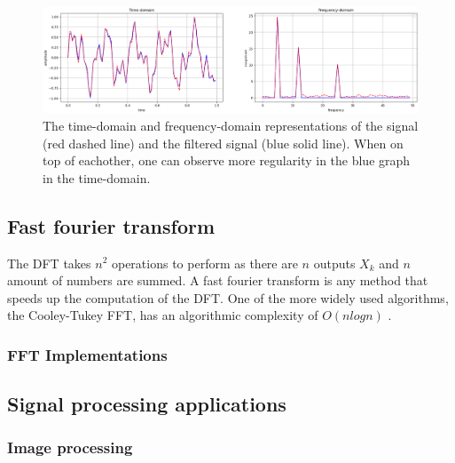 \begin{figure}[ht]
    \centering
    \includegraphics[width=\textwidth]{./images/filtered_signal.png}
    \caption{The time-domain and frequency-domain representations of the signal (red dashed line) and the filtered signal (blue solid line). When on top of eachother, one can observe more regularity in the blue graph in the time-domain.\label{fig:DFT-IDFT}}
\end{figure}

\subsection{Fast fourier transform}
The DFT takes $n^2$ operations to perform as there are $n$ outputs $X_k$ and $n$ amount of numbers are summed. A fast fourier transform is any method that speeds up the computation of the DFT. One of the more widely used algorithms, the Cooley-Tukey FFT, has an algorithmic complexity of $O(n log n)$ \cite{Randhawa2018} \cite{HeidemanEtAl1984}.
\subsubsection{FFT Implementations}

\subsection{Signal processing applications}

\subsubsection{Image processing}






